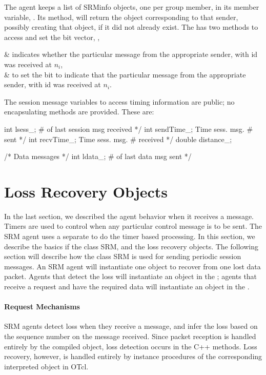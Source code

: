 The agent keeps a list of SRMinfo objects, one per group member,
in its member variable, .
Its method, 
will return the object corresponding to that sender,
possibly creating that object, if it did not already exist.
The  has two methods
to access and set the bit vector, \ie,
\begin{alist}
 & indicates whether the particular message
                from the appropriate sender, with id 
                 was received at $n_i$,\\
 & to set the bit to indicate that the
                particular message from the appropriate sender,
                with id  was received at $n_i$.
\end{alist}
The session message variables to access timing information are public;
no encapsulating methods are provided.  These are:
\begin{program}
        int     lsess_;                   \* # of last session msg received */
        int     sendTime_;                \* Time sess. msg. # sent */
        int     recvTime_;                \* Time sess. msg. # received */
        double  distance_;

        /* {\cf Data messages} */
        int     ldata_;                   \* # of last data msg sent */
\end{program}

\section{Loss Recovery Objects}
\label{sec:recovery}

In the last section,
we described the agent behavior when it receives a message.
Timers are used to control when any particular control message is to be sent.
The SRM agent uses a separate
to do the timer based processing.
In this section, we describe the basics if the class SRM,
and the loss recovery objects.
The following section will describe how the class SRM is used 
for sending periodic session messages.
An SRM agent will instantiate one object to recover from one lost data packet.
Agents that detect the loss will instantiate an object in the
;
agents that receive a request and have the required data will
instantiate an object in the .

\paragraph{Request Mechanisms}
SRM agents detect loss when they receive a message, and
infer the loss based on the sequence number on the message received.
Since packet reception is handled entirely by the compiled object,
loss detection occurs in the C++ methods.
Loss recovery, however, is handled entirely by instance procedures
of the corresponding interpreted object in OTcl.

